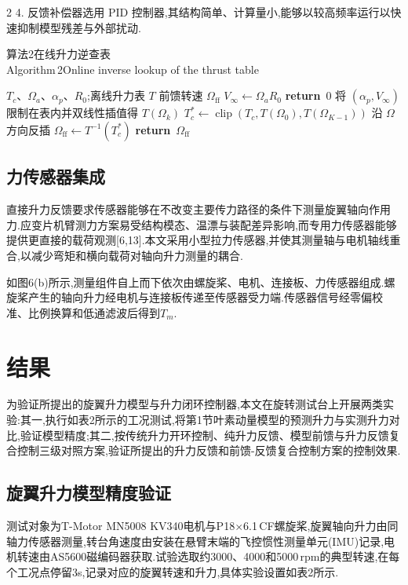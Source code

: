 \documentclass{aas}
\begin{document}
\begin{multicols}{2}
4. 反馈补偿器选用 PID 控制器,其结构简单、计算量小,能够以较高频率运行以快速抑制模型残差与外部扰动.
\begin{center}
\begin{minipage}{0.98\columnwidth}
\centering
{\small 算法2\quad 在线升力逆查表
\\
Algorithm\,2\quad Online inverse lookup of the thrust table}
\vskip2mm
\footnotesize
\begin{algorithmic}[1]
\Require $T_c$、$\Omega_a$、$\alpha_p$、$R_0$;离线升力表 $T$
\Ensure 前馈转速 $\Omega_{\mathrm{ff}}$
\State $V_\infty\gets\Omega_aR_0$
    \State \textbf{return}\ $0$
\EndIf
\State 将 $(\alpha_p,V_\infty)$ 限制在表内并双线性插值得 $T(\Omega_k)$
\State $T_c^*\gets\operatorname{clip}\!\left(T_c,T(\Omega_0),T(\Omega_{K-1})\right)$
\State 沿 $\Omega$ 方向反插 $\Omega_{\mathrm{ff}}\gets T^{-1}(T_c^*)$
\State \textbf{return}\ $\Omega_{\mathrm{ff}}$
\end{algorithmic}
\end{minipage}
\end{center}

\subsection{力传感器集成}
直接升力反馈要求传感器能够在不改变主要传力路径的条件下测量旋翼轴向作用力.应变片机臂测力方案易受结构模态、温漂与装配差异影响,而专用力传感器能够提供更直接的载荷观测[6,13].本文采用小型拉力传感器,并使其测量轴与电机轴线重合,以减少弯矩和横向载荷对轴向升力测量的耦合.

如图6(b)所示,测量组件自上而下依次由螺旋桨、电机、连接板、力传感器组成.螺旋桨产生的轴向升力经电机与连接板传递至传感器受力端.传感器信号经零偏校准、比例换算和低通滤波后得到$T_m$.

\section{结果}
\label{sec:experiment}

为验证所提出的旋翼升力模型与升力闭环控制器,本文在旋转测试台上开展两类实验:其一,执行如表2所示的工况测试,将第1节叶素动量模型的预测升力与实测升力对比,验证模型精度;其二,按传统升力开环控制、纯升力反馈、模型前馈与升力反馈复合控制三级对照方案,验证所提出的升力反馈和前馈-反馈复合控制方案的控制效果.

\subsection{旋翼升力模型精度验证}
\label{subsec:model_verif}
测试对象为T-Motor MN5008 KV340电机与P18$\times$6.1\,CF螺旋桨,旋翼轴向升力由同轴力传感器测量,转台角速度由安装在悬臂末端的飞控惯性测量单元(IMU)记录,电机转速由AS5600磁编码器获取.试验选取约3000、4000和5000\,rpm的典型转速,在每个工况点停留3s,记录对应的旋翼转速和升力,具体实验设置如表2所示.


\end{multicols}
\end{document}
